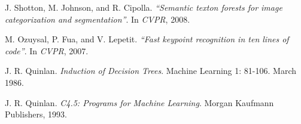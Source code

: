 \begin{thebibliography}{100}
		J. Shotton, M. Johnson, and R. Cipolla.
		\emph{``Semantic texton forests for image categorization and segmentation''}.
		In \textit{CVPR}, 2008.
		
		M. Ozuysal, P. Fua, and V. Lepetit.
		\emph{``Fast keypoint recognition in ten lines of code''}.
		In \textit{CVPR}, 2007.
		
		J. R. Quinlan.
		\emph{Induction of Decision Trees}.
		Machine Learning 1: 81-106.
		March 1986.
		
		J. R. Quinlan.
		\emph{C4.5: Programs for Machine Learning}.
		Morgan Kaufmann Publishers, 1993.
		
	
		
				
\end{thebibliography}